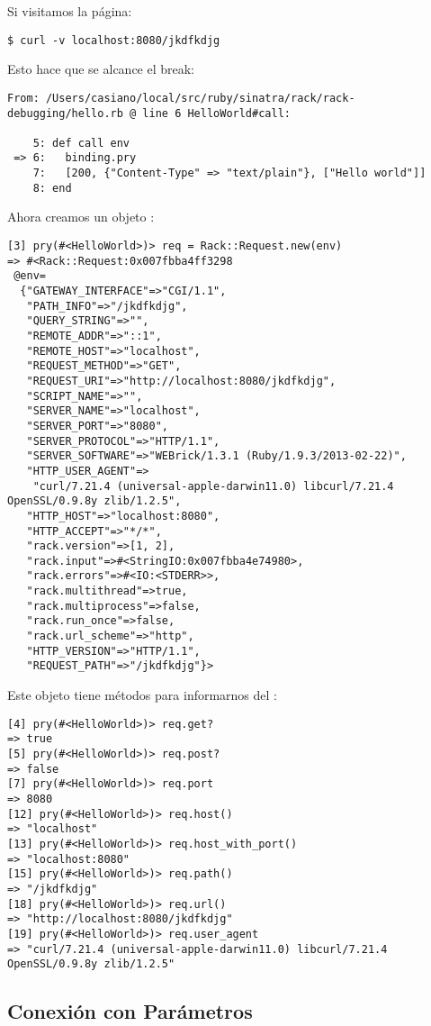 Si visitamos la página:
\begin{verbatim}
$ curl -v localhost:8080/jkdfkdjg
\end{verbatim}

Esto hace que se alcance el break:
\begin{verbatim}
From: /Users/casiano/local/src/ruby/sinatra/rack/rack-debugging/hello.rb @ line 6 HelloWorld#call:

    5: def call env
 => 6:   binding.pry
    7:   [200, {"Content-Type" => "text/plain"}, ["Hello world"]]
    8: end
\end{verbatim}
Ahora creamos un objeto
\rackrequest{}:

\begin{verbatim}
[3] pry(#<HelloWorld>)> req = Rack::Request.new(env)
=> #<Rack::Request:0x007fbba4ff3298
 @env=
  {"GATEWAY_INTERFACE"=>"CGI/1.1",
   "PATH_INFO"=>"/jkdfkdjg",
   "QUERY_STRING"=>"",
   "REMOTE_ADDR"=>"::1",
   "REMOTE_HOST"=>"localhost",
   "REQUEST_METHOD"=>"GET",
   "REQUEST_URI"=>"http://localhost:8080/jkdfkdjg",
   "SCRIPT_NAME"=>"",
   "SERVER_NAME"=>"localhost",
   "SERVER_PORT"=>"8080",
   "SERVER_PROTOCOL"=>"HTTP/1.1",
   "SERVER_SOFTWARE"=>"WEBrick/1.3.1 (Ruby/1.9.3/2013-02-22)",
   "HTTP_USER_AGENT"=>
    "curl/7.21.4 (universal-apple-darwin11.0) libcurl/7.21.4 OpenSSL/0.9.8y zlib/1.2.5",
   "HTTP_HOST"=>"localhost:8080",
   "HTTP_ACCEPT"=>"*/*",
   "rack.version"=>[1, 2],
   "rack.input"=>#<StringIO:0x007fbba4e74980>,
   "rack.errors"=>#<IO:<STDERR>>,
   "rack.multithread"=>true,
   "rack.multiprocess"=>false,
   "rack.run_once"=>false,
   "rack.url_scheme"=>"http",
   "HTTP_VERSION"=>"HTTP/1.1",
   "REQUEST_PATH"=>"/jkdfkdjg"}>
\end{verbatim}
Este objeto \rackrequest{} tiene métodos para informarnos del 
\rackrequest{}:
\begin{verbatim}
[4] pry(#<HelloWorld>)> req.get?
=> true
[5] pry(#<HelloWorld>)> req.post?
=> false
[7] pry(#<HelloWorld>)> req.port
=> 8080
[12] pry(#<HelloWorld>)> req.host()
=> "localhost"
[13] pry(#<HelloWorld>)> req.host_with_port()
=> "localhost:8080"
[15] pry(#<HelloWorld>)> req.path()
=> "/jkdfkdjg"
[18] pry(#<HelloWorld>)> req.url()
=> "http://localhost:8080/jkdfkdjg"
[19] pry(#<HelloWorld>)> req.user_agent
=> "curl/7.21.4 (universal-apple-darwin11.0) libcurl/7.21.4 OpenSSL/0.9.8y zlib/1.2.5"
\end{verbatim}

\subsection{Conexión con Parámetros}

